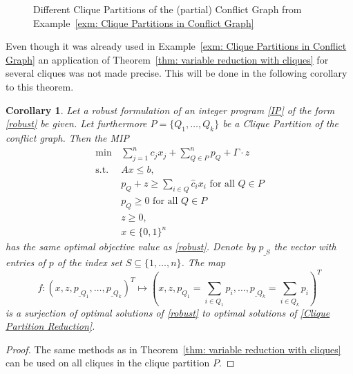 \documentclass[titlepage, a4paper]{amsbook}
\theoremstyle{plain}
\newtheorem{cor}[thm]{Corollary}
\theoremstyle{break}
\theoremstyle{definition}
\theoremstyle{remark}
\numberwithin{equation}{thm}
\begin{document}
\begin{figure}
\begin{subfigure}{0.3\textwidth}
\end{subfigure}
\caption{Different Clique Partitions of the (partial) Conflict Graph from Example~\ref{exm: Clique Partitions in Conflict Graph}}\label{img: Clique Partitions in Conflict Graph}
\end{figure}
Even though it was already used in Example~\ref{exm: Clique Partitions in Conflict Graph} an application of Theorem~\ref{thm: variable reduction with cliques} for several cliques was not made precise. This will be done in the following corollary to this theorem.
\begin{cor}
Let a robust formulation of an integer program \eqref{IP} of the form \eqref{robust} be given. Let furthermore $P=\{Q_1, \ldots, Q_k\}$ be a Clique Partition of the conflict graph. Then the MIP
\begin{equation}\label{Clique Partition Reduction}
\begin{split}
    \min\, &\sum_{j=1}^{n} c_j x_j + \sum_{Q \in P}^{n}p_Q + \Gamma \cdot z\\
    \text{s.t. } &Ax \leq b, \\
    &p_{Q}+ z \geq \sum_{i \in Q} \hat{c}_ix_i \text{ for all }Q \in P \\
  &p_Q \geq 0 \text{ for all }Q \in P \\
  &z \geq 0, \\
    &x \in \{0,1\}^n
\end{split}
\end{equation}
has the same optimal objective value as \eqref{robust}.
Denote by $p_{\_S}$ the vector with entries of $p$ of the index set $S \subseteq \{1, \ldots, n\}$. The map 
\[f:(x, z, p_{\_Q_1}, \ldots, p_{\_Q_k})^T \mapsto (x, z, p_{Q_1}=\sum_{i \in Q_1}p_i, \ldots,  p_{\_Q_k}=\sum_{i \in Q_k}p_i)^T \]
is a surjection of optimal solutions of \eqref{robust} to optimal solutions of \eqref{Clique Partition Reduction}.
\end{cor}
\begin{proof}
The same methods as in Theorem~\ref{thm: variable reduction with cliques} can be used on all cliques in the clique partition $P$.
\end{proof}
\end{document}
